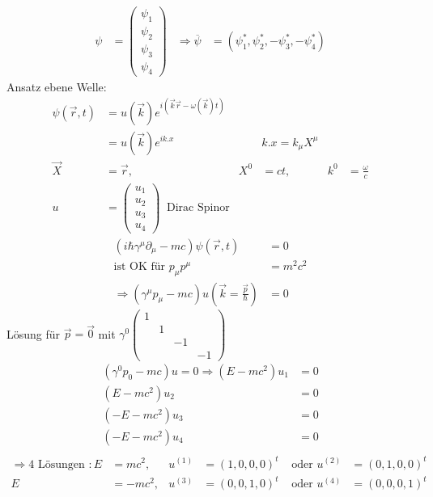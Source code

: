 	\begin{align*}
		\psi &=
		\begin{pmatrix}
			\psi_1 \\
			\psi_2 \\
			\psi_3 \\
			\psi_4
		\end{pmatrix}
		&\Rightarrow \overline{\psi} &=
		(\psi_1^*, \psi_2^*, -\psi_3^*, -\psi_4^*) 
	\end{align*}
Ansatz ebene Welle:
	\begin{align*}
		\psi (\vec{r}, t) &=
		u(\vec{k}) e^{i(\vec{k}\vec{r} - \omega(\vec{k}) t)} \\
		&= u(\vec{k}) e^{ik.x} 
		& &k. x= k_\mu X^\mu \\
		\vec{X} &= \vec{r} ,& X^0 &= ct,& k^0 &= \frac{\omega}{c} \\
		u &=
		\begin{pmatrix}
			u_1 \\
			u_2 \\
			u_3 \\
			u_4
		\end{pmatrix}
		~ \text{ Dirac Spinor}
	\end{align*}
	\begin{align*}
		\left(i \hbar \gamma^\mu \partial_\mu - mc\right)
		\psi(\vec{r}, t) &= 0 \\
		\text{ist OK für } p_\mu p^\mu &= m^2 c^2 \\
		\Rightarrow (\gamma^\mu p_\mu - mc) u \left(\vec{k} = \frac{\vec{p}}{\hbar}\right) &= 0 
	\end{align*}
Lösung für $\vec{p} = \vec{0}$ mit 
$ \gamma^0\begin{pmatrix}
1 & & \\
& 1 && \\
&& -1 & \\
&&& -1 
\end{pmatrix}$
	\begin{align*}
		(\gamma^0 p_0 - mc) u = 0 \Rightarrow
		(E-mc^2) u_1 &= 0 \\
		(E-mc^2) u_2 &= 0 \\
		(-E-mc^2) u_3 &= 0 \\
		(-E-mc^2) u_4 &= 0 \\
	\end{align*}
	\begin{align*}
		\Rightarrow 4 \text{ Lösungen }: 
		E &= mc^2 ,& u^{(1)} &= (1, 0 ,0 ,0)^t &\text{ oder } 
		u^{(2)} &= (0,1,0,0)^t \\
		E &= -mc^2 ,& u^{(3)} &= (0, 0, 1, 0)^t &\text{ oder }
		u^{(4)} &= (0,0,0,1)^t
	\end{align*}
